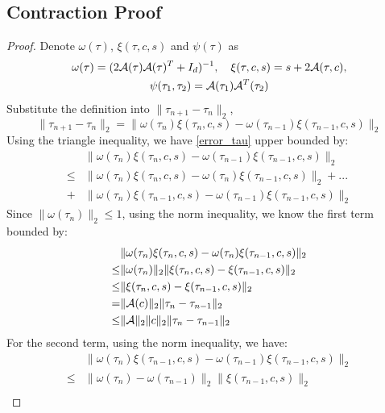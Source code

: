 \documentclass[aos,preprint]{imsart}
\theoremstyle{remark}
\begin{document}
\begin{appendix}
\subsection{Contraction Proof}
\begin{proof}\label{contraction}
Denote $\omega(\tau)$, $\xi(\tau, c, s)$ and $\psi(\tau)$ as
\begin{gather*}
\omega(\tau) = (2{\cal A}(\tau){\cal A}(\tau)^T+I_d)^{-1},\quad
\xi(\tau, c, s) = s+2{\cal A}(\tau,c),\\
\psi(\tau_1,\tau_2) = {\cal A}(\tau_1){\cal A}^T(\tau_2)
\end{gather*}
Substitute the definition into $\|\tau_{n+1}-\tau_{n} \|_2$, 
\begin{equation}\label{error_tau}
\|\tau_{n+1}-\tau_{n} \|_2
=\|\omega(\tau_n)\xi(\tau_n, c, s) -\omega(\tau_{n-1})\xi(\tau_{n-1}, c, s) \|_2
\end{equation}
Using the triangle inequality, we have \eqref{error_tau} upper bounded by:
\[
\begin{aligned}
&\|\omega(\tau_n)\xi(\tau_n, c, s) -\omega(\tau_{n-1})\xi(\tau_{n-1}, c, s) \|_2\\
\leq &\|\omega(\tau_n)\xi(\tau_n, c, s) -\omega(\tau_{n})\xi(\tau_{n-1}, c, s) \|_2+...\\
+ &\|\omega(\tau_n)\xi(\tau_{n-1}, c, s) -\omega(\tau_{n-1})\xi(\tau_{n-1}, c, s) \|_2
\end{aligned}
\]
Since $\|\omega(\tau_n)\|_2\leq 1$, using the norm inequality, we know the first term bounded by:
\[
\begin{aligned}
&\|\omega(\tau_n)\xi(\tau_n, c, s) -\omega(\tau_{n})\xi(\tau_{n-1}, c, s) \|_2\\
\leq & \|\omega(\tau_n)\|_2\|\xi(\tau_n, c, s)-\xi(\tau_{n-1}, c, s)\|_2\\
\leq &\|\xi(\tau_n, c, s)-\xi(\tau_{n-1}, c, s)\|_2\\
=& \|{\cal A}(c)\|_2\|\tau_n-\tau_{n-1}\|_2\\
\leq & \|{\cal A}\|_2 \|c\|_2 \|\tau_n-\tau_{n-1}\|_2
\end{aligned}
\]
For the second term, using the norm inequality, we have:
\[
\begin{aligned}
&\|\omega(\tau_n)\xi(\tau_{n-1}, c, s) -\omega(\tau_{n-1})\xi(\tau_{n-1}, c, s) \|_2\\
\leq & \|\omega(\tau_n)-\omega(\tau_{n-1})\|_2\|\xi(\tau_{n-1}, c, s)\|_2\\

\end{aligned}\]
\end{proof}
\end{appendix}
\end{document}
